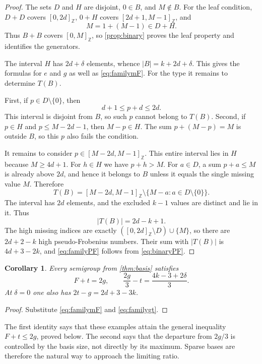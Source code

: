 \documentclass[11pt,letterpaper]{article}
\numberwithin{equation}{section}
\newtheorem{corollary}[theorem]{Corollary}
\theoremstyle{definition}
\theoremstyle{remark}
\newcommand{\Z}{\mathbb Z}
\newcommand{\ints}[2]{[#1,#2]_{\Z}}
\begin{document}
\begin{proof}
The sets $D$ and $H$ are disjoint, $0\in B$, and $M\notin B$.
For the leaf condition, $D+D$ covers $\ints{0}{2d}$,
$0+H$ covers $\ints{2d+1}{M-1}$, and
\[
 M=1+(M-1)\in D+H.
\]
Thus $B+B$ covers $\ints{0}{M}$, so \cref{prop:binary} proves the leaf
property and identifies the generators.

The interval $H$ has $2d+\delta$ elements, whence
$|B|=k+2d+\delta$. This gives the formulas for $e$ and $g$ as well as
\eqref{eq:familymF}. For the type it remains to determine $T(B)$.

First, if $p\in D\setminus\{0\}$, then
\[
 d+1\le p+d\le2d.
\]
This interval is disjoint from $B$, so such $p$ cannot belong to $T(B)$.
Second, if $p\in H$ and $p\le M-2d-1$, then $M-p\in H$. The sum
$p+(M-p)=M$ is outside $B$, so this $p$ also fails the condition.

It remains to consider $p\in\ints{M-2d}{M-1}$. This entire interval lies
in $H$ because $M\ge4d+1$. For $h\in H$ we have $p+h>M$.
For $a\in D$, a sum $p+a\le M$ is already above $2d$, and hence it
belongs to $B$ unless it equals the single missing value $M$. Therefore
\begin{equation}\label{eq:Tfamily}
 T(B)=\ints{M-2d}{M-1}\setminus
       \{M-a:a\in D\setminus\{0\}\}.
\end{equation}
The interval has $2d$ elements, and the excluded $k-1$ values are distinct
and lie in it. Thus
\[
 |T(B)|=2d-k+1.
\]
The high missing indices are exactly $(\ints{0}{2d}\setminus D)\cup\{M\}$,
so there are $2d+2-k$ high pseudo-Frobenius numbers. Their sum with
$|T(B)|$ is $4d+3-2k$, and \eqref{eq:familyPF} follows from
\eqref{eq:binaryPF}.
\end{proof}

\begin{corollary}\label{cor:familydefect}
Every semigroup from \cref{thm:basis} satisfies
\begin{equation}\label{eq:defectfamily}
 F+t=2g,\qquad
 \frac{2g}{3}-t=\frac{4k-3+2\delta}{3}.
\end{equation}
At $\delta=0$ one also has $2t-g=2d+3-3k$.
\end{corollary}

\begin{proof}
Substitute \eqref{eq:familymF} and \eqref{eq:familygt}.
\end{proof}

The first identity says that these examples attain the general inequality
$F+t\le2g$, proved below. The second says that the departure from $2g/3$
is controlled by the basis size, not directly by its maximum. Sparse bases
are therefore the natural way to approach the limiting ratio.
\end{document}
